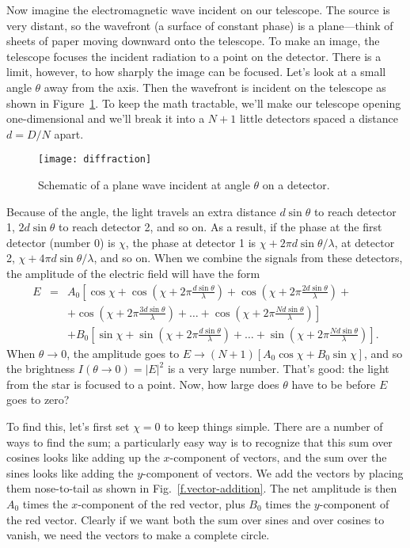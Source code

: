 Now imagine the electromagnetic wave incident on our telescope. The source is very distant, so the wavefront (a surface of constant phase) is a plane---think of sheets of paper moving downward onto the telescope.  To make an image, the telescope focuses the incident radiation to a point on the detector. There is a limit, however, to how sharply the image can be focused.  Let's look at a small angle $\theta$ away from the axis.  Then the wavefront is incident on the telescope as shown in Figure~\ref{f.diffraction}. To keep the math tractable, we'll make our telescope opening one-dimensional and we'll break it into a $N+1$ little detectors spaced a distance $d = D/N$ apart.

\begin{figure}[hb]
\texttt{[image: diffraction]}
\caption[A plane wave incident on a detector]{Schematic of a plane wave incident at angle $\theta$ on a detector.}
\label{f.diffraction}
\end{figure}

Because of the angle, the light travels an extra distance $d\sin\theta$ to reach detector 1, $2d\sin\theta$ to reach detector 2, and so on.  As a result, if the phase at the first detector (number 0) is $\chi$, the phase at detector 1 is $\chi + 2\pi d\sin\theta/\lambda$, at detector 2,  $\chi + 4\pi d\sin\theta/\lambda$, and so on.  When we combine the signals from these detectors, the amplitude of the electric field will have the form
\begin{eqnarray*}
E &=& A_{0}\left[\cos\chi + \cos\left(\chi + 2\pi\frac{d\sin\theta}{\lambda}\right)
	+ \cos\left(\chi + 2\pi\frac{2d\sin\theta}{\lambda}\right) + \right.\\
	&&	+ \left.\cos\left(\chi + 2\pi\frac{3d\sin\theta}{\lambda}\right) + \ldots 
	+ \cos\left(\chi + 2\pi\frac{Nd\sin\theta}{\lambda}\right)\right]\\
	&& + B_{0}\left[ \sin\chi + \sin\left(\chi + 2\pi\frac{d\sin\theta}{\lambda}\right) 
		+ \ldots + \sin\left(\chi+2\pi\frac{Nd\sin\theta}{\lambda}\right)\right].
\end{eqnarray*}
When $\theta \to 0$, the amplitude goes to $E \to (N+1)\left[A_{0}\cos\chi + B_{0}\sin\chi\right]$, and so the brightness $I(\theta\to 0) = |E|^{2}$ is a very large number.  That's good: the light from the star is focused to a point. Now, how large does $\theta$ have to be before $E$ goes to zero?

To find this, let's first set $\chi = 0$ to keep things simple. There are a number of ways to find the sum; a particularly easy way is to recognize that this sum over cosines looks like adding up the $x$-component of vectors, and the sum over the sines looks like adding the $y$-component of vectors.  We add the vectors by placing them nose-to-tail as shown in Fig.~\ref{f.vector-addition}.  The net amplitude is then $A_{0}$ times the $x$-component of the red vector, plus $B_{0}$ times the $y$-component of the red vector.  Clearly if we want both the sum over sines and over cosines to vanish, we need the vectors to make a complete circle.

